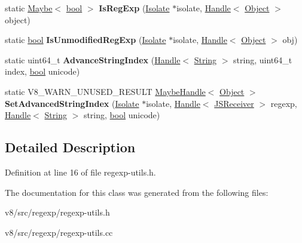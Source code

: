 \begin{DoxyCompactItemize}
\item 
\mbox{\label{classv8_1_1internal_1_1RegExpUtils_ac698c7697ce79c101b3b05d1dbb10235}} 
static \mbox{\hyperlink{classv8_1_1Maybe}{Maybe}}$<$ \mbox{\hyperlink{classbool}{bool}} $>$ {\bfseries Is\+Reg\+Exp} (\mbox{\hyperlink{classv8_1_1internal_1_1Isolate}{Isolate}} $\ast$isolate, \mbox{\hyperlink{classv8_1_1internal_1_1Handle}{Handle}}$<$ \mbox{\hyperlink{classv8_1_1internal_1_1Object}{Object}} $>$ object)
\item 
\mbox{\label{classv8_1_1internal_1_1RegExpUtils_a9ba7cdd314948702ba0549c717a1024e}} 
static \mbox{\hyperlink{classbool}{bool}} {\bfseries Is\+Unmodified\+Reg\+Exp} (\mbox{\hyperlink{classv8_1_1internal_1_1Isolate}{Isolate}} $\ast$isolate, \mbox{\hyperlink{classv8_1_1internal_1_1Handle}{Handle}}$<$ \mbox{\hyperlink{classv8_1_1internal_1_1Object}{Object}} $>$ obj)
\item 
\mbox{\label{classv8_1_1internal_1_1RegExpUtils_a3b8eb01a5d32715bd31dc1655914d8d5}} 
static uint64\+\_\+t {\bfseries Advance\+String\+Index} (\mbox{\hyperlink{classv8_1_1internal_1_1Handle}{Handle}}$<$ \mbox{\hyperlink{classv8_1_1internal_1_1String}{String}} $>$ string, uint64\+\_\+t index, \mbox{\hyperlink{classbool}{bool}} unicode)
\item 
\mbox{\label{classv8_1_1internal_1_1RegExpUtils_a219146cdfc5b8e24dc12b18b2b9869ec}} 
static V8\+\_\+\+W\+A\+R\+N\+\_\+\+U\+N\+U\+S\+E\+D\+\_\+\+R\+E\+S\+U\+LT \mbox{\hyperlink{classv8_1_1internal_1_1MaybeHandle}{Maybe\+Handle}}$<$ \mbox{\hyperlink{classv8_1_1internal_1_1Object}{Object}} $>$ {\bfseries Set\+Advanced\+String\+Index} (\mbox{\hyperlink{classv8_1_1internal_1_1Isolate}{Isolate}} $\ast$isolate, \mbox{\hyperlink{classv8_1_1internal_1_1Handle}{Handle}}$<$ \mbox{\hyperlink{classv8_1_1internal_1_1JSReceiver}{J\+S\+Receiver}} $>$ regexp, \mbox{\hyperlink{classv8_1_1internal_1_1Handle}{Handle}}$<$ \mbox{\hyperlink{classv8_1_1internal_1_1String}{String}} $>$ string, \mbox{\hyperlink{classbool}{bool}} unicode)
\end{DoxyCompactItemize}


\subsection{Detailed Description}


Definition at line 16 of file regexp-\/utils.\+h.



The documentation for this class was generated from the following files\+:\begin{DoxyCompactItemize}
\item 
v8/src/regexp/regexp-\/utils.\+h\item 
v8/src/regexp/regexp-\/utils.\+cc\end{DoxyCompactItemize}
